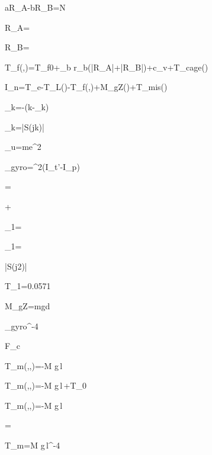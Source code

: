 aR_A-bR_B=\times N

R_A=

R_B=

T_f\left(\theta,\omega\right)=T_{f0}+\mu_b r_b\left(\left|R_A\right|+\left|R_B\right|\right)+c_v\omega+T_{cage}\left(\theta\right)

I_n\dot{\omega}=T_e-T_L\left(\theta\right)-T_f\left(\theta,\omega\right)+M_{gZ}\left(\theta\right)+T_{mis}\left(\theta\right)

\Delta\omega_k=-\sin\left(k\theta-\psi_k\right)

\Delta\omega_k=\left|S\left(jk\omega\right)\right|

_u=me\omega^2

\tau_{gyro}=\omega^2\left(I_t'-I_p\right)\sin\beta\cos\beta

=

+\theta

\Delta\omega_1=

\Delta\omega_1=\ 

\left|S\left(j2\pi{}\right)\right|

T_1\approx{}=0.0571\ 

M_{gZ}=mgd

\tau_{gyro}^{-4}\ 

F_c\ 

T_m\left(\theta,\omega,\beta\right)=-M g\,l\sin\beta\,\sin\theta

T_m\left(\theta,\omega,\beta\right)=-M g\,l\sin\beta\,\sin\theta+\kappa T_0

T_m\left(\theta,\omega,\beta\right)=-\kappa M g\,l\sin\beta\,\sin\theta

\theta=

T_m=M g\,l\sin\beta{}^{-4}\ 
